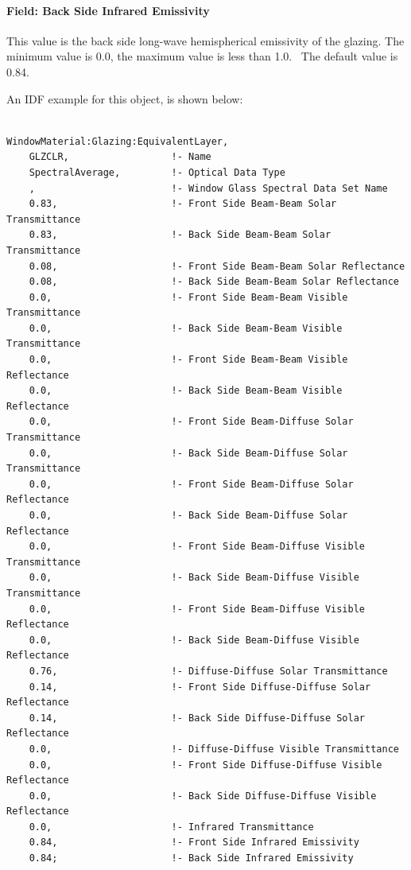 \paragraph{Field: Back Side Infrared Emissivity}\label{field-back-side-infrared-emissivity}

This value is the back side long-wave hemispherical emissivity of the glazing. The minimum value is 0.0, the maximum value is less than 1.0.~ The default value is 0.84.

An IDF example for this object, is shown below:

\begin{lstlisting}

WindowMaterial:Glazing:EquivalentLayer,
    GLZCLR,                  !- Name
    SpectralAverage,         !- Optical Data Type
    ,                        !- Window Glass Spectral Data Set Name
    0.83,                    !- Front Side Beam-Beam Solar Transmittance
    0.83,                    !- Back Side Beam-Beam Solar Transmittance
    0.08,                    !- Front Side Beam-Beam Solar Reflectance
    0.08,                    !- Back Side Beam-Beam Solar Reflectance
    0.0,                     !- Front Side Beam-Beam Visible Transmittance
    0.0,                     !- Back Side Beam-Beam Visible Transmittance
    0.0,                     !- Front Side Beam-Beam Visible Reflectance
    0.0,                     !- Back Side Beam-Beam Visible Reflectance
    0.0,                     !- Front Side Beam-Diffuse Solar Transmittance
    0.0,                     !- Back Side Beam-Diffuse Solar Transmittance
    0.0,                     !- Front Side Beam-Diffuse Solar Reflectance
    0.0,                     !- Back Side Beam-Diffuse Solar Reflectance
    0.0,                     !- Front Side Beam-Diffuse Visible Transmittance
    0.0,                     !- Back Side Beam-Diffuse Visible Transmittance
    0.0,                     !- Front Side Beam-Diffuse Visible Reflectance
    0.0,                     !- Back Side Beam-Diffuse Visible Reflectance
    0.76,                    !- Diffuse-Diffuse Solar Transmittance
    0.14,                    !- Front Side Diffuse-Diffuse Solar Reflectance
    0.14,                    !- Back Side Diffuse-Diffuse Solar Reflectance
    0.0,                     !- Diffuse-Diffuse Visible Transmittance
    0.0,                     !- Front Side Diffuse-Diffuse Visible Reflectance
    0.0,                     !- Back Side Diffuse-Diffuse Visible Reflectance
    0.0,                     !- Infrared Transmittance
    0.84,                    !- Front Side Infrared Emissivity
    0.84;                    !- Back Side Infrared Emissivity
\end{lstlisting}


